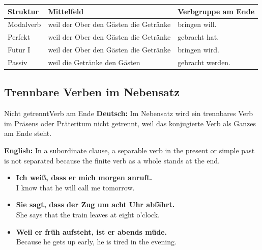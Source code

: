 \documentclass[a4paper,11pt]{article}
\newcommand{\GermanText}[1]{\textbf{Deutsch: }#1\par}
\newcommand{\EnglishText}[1]{{\small\color{SoftGray}\textbf{English: }#1\par}}
\newcommand{\ExampleItem}[2]{\item \textbf{#1}\\{\small\color{SoftGray}#2}}
\newcommand{\TableHeader}[1]{\color{white}\textbf{#1}}
\begin{document}
            \begin{longtable}{|p{3.0cm}|p{8.0cm}|p{3.6cm}|}
                \hline
                \rowcolor{HeaderBlueDark}
                \TableHeader{Struktur} & \TableHeader{Mittelfeld} & \TableHeader{Verbgruppe am Ende} \\
                \hline
                Modalverb & weil der Ober den Gästen die Getränke & bringen will. \\
                \hline
                Perfekt & weil der Ober den Gästen die Getränke & gebracht hat. \\
                \hline
                Futur I & weil der Ober den Gästen die Getränke & bringen wird. \\
                \hline
                Passiv & weil die Getränke den Gästen & gebracht werden. \\
                \hline
            \end{longtable}
        
        \subsection{Trennbare Verben im Nebensatz}
            
            \begin{grammarentry}{Nicht getrennt}{Verb am Ende}
                \GermanText{Im Nebensatz wird ein trennbares Verb im Präsens oder Präteritum nicht getrennt, weil das konjugierte Verb als Ganzes am Ende steht.}
                \EnglishText{In a subordinate clause, a separable verb in the present or simple past is not separated because the finite verb as a whole stands at the end.}
            \end{grammarentry}
            
            \begin{exbox}
                \begin{itemize}
                    \ExampleItem{Ich weiß, dass er mich morgen anruft.}{I know that he will call me tomorrow.}
                    \ExampleItem{Sie sagt, dass der Zug um acht Uhr abfährt.}{She says that the train leaves at eight o'clock.}
                    \ExampleItem{Weil er früh aufsteht, ist er abends müde.}{Because he gets up early, he is tired in the evening.}
                \end{itemize}
            \end{exbox}
    
    
\end{document}
